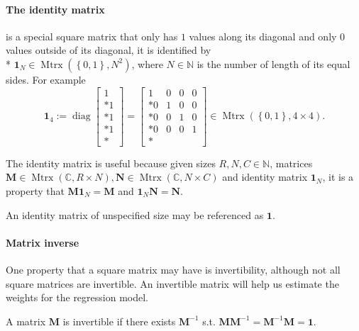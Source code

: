 \documentclass{article}
\begin{document}
\paragraph{The identity matrix}
is a special square matrix that only has $1$ values along its diagonal and only $0$ values outside of its diagonal, it is identified by\\* $\mathbf1_N \in \operatorname{Mtrx}\left(\left\{0,1\right\},N^2\right)$, where $N \in \mathbb{N}$ is the number of length of its equal sides. For example
\begin{equation}
    \mathbf1_4 := \operatorname{diag}\!\left[
        \begin{matrix}
            1 \\* 1 \\* 1 \\* 1 \\*
        \end{matrix}
    \right] = \left[
        \begin{matrix}
            1 & 0 & 0 & 0 \\*
            0 & 1 & 0 & 0 \\*
            0 & 0 & 1 & 0 \\*
            0 & 0 & 0 & 1 \\*
        \end{matrix}
    \right] \in \operatorname{Mtrx}\left(\left\{0, 1\right\}, 4\times4\right).
\end{equation}

The identity matrix is useful because given sizes $R,N,C \in \mathbb{N}$, matrices $\mathbf{M} \in \operatorname{Mtrx}(\mathbb{C},R\times N), \mathbf{N} \in \operatorname{Mtrx}(\mathbb{C},N\times C)$ and identity matrix $\mathbf{1}_N$,
it is a property that $\mathbf{M}\mathbf{1}_N = \mathbf{M}$ and $\mathbf{1}_N\mathbf{N}=\mathbf{N}$.

An identity matrix of unspecified size may be referenced as $\mathbf1$.

\paragraph{Matrix inverse}

One property that a square matrix may have is invertibility, although not all square matrices are invertible. An invertible matrix will help us estimate the weights for the regression model.

A matrix $\mathbf{M}$ is invertible if there exists $\mathbf{M}^{-1}$ s.t. $\mathbf{M}\mathbf{M}^{-1} = \mathbf{M}^{-1}\mathbf{M} = \mathbf1$.
\end{document}
